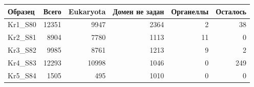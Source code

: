 \begin{tabular}{lrrrrr}
\toprule
Образец & Всего & Eukaryota & Домен не задан & Органеллы & Осталось \\
\midrule
Kr1\_S80 & 12351 & 9947 & 2364 & 2 & 38 \\
Kr2\_S81 & 8904 & 7780 & 1113 & 11 & 0 \\
Kr3\_S82 & 9985 & 8761 & 1213 & 9 & 2 \\
Kr4\_S83 & 12293 & 10998 & 1046 & 0 & 249 \\
Kr5\_S84 & 1505 & 495 & 1010 & 0 & 0 \\
\bottomrule
\end{tabular}

